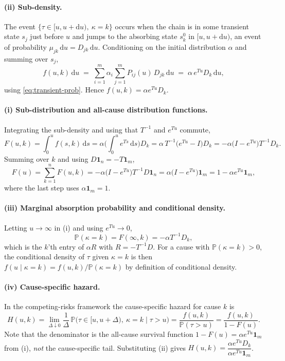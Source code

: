 \documentclass{article}
\newcommand{\Prob}{\mathbb{P}}
\newcommand{\subchg}[1]{#1}
\begin{document}
\paragraph{(ii) Sub-density.}
The event $\{\tau\in[u,u+\mathrm{d}u),\ \kappa=k\}$ occurs when the chain is in some transient state $s_j$ just before $u$ and jumps to the absorbing state $s^0_k$ in $[u,u+\mathrm{d}u)$, an event of probability $\mu_{jk}\,\mathrm{d}u=D_{jk}\,\mathrm{d}u$. Conditioning on the initial distribution $\alpha$ and summing over $s_j$,
\[
f(u,k)\,\mathrm{d}u \;=\; \sum_{i=1}^m \alpha_i \sum_{j=1}^m P_{ij}(u)\, D_{jk}\,\mathrm{d}u
\;=\; \alpha\, e^{Tu} D_k\,\mathrm{d}u,
\]
using \eqref{eq:transient-prob}. Hence $f(u,k)=\alpha e^{Tu}D_k$.

\paragraph{(i) Sub-distribution and all-cause distribution functions.}
Integrating the sub-density and using that $T^{-1}$ and $e^{Tu}$ commute,
\[
F(u,k)=\int_0^u f(s,k)\,\mathrm{d}s
=\alpha\Big(\int_0^u e^{Ts}\,\mathrm{d}s\Big)D_k
=\alpha\, T^{-1}\big(e^{Tu}-I\big)D_k
=-\alpha\big(I-e^{Tu}\big)T^{-1}D_k.
\]
Summing over $k$ and using $D\mathbf{1}_n=-T\mathbf{1}_m$,
\[
F(u)=\sum_{k=1}^n F(u,k)
=-\alpha\big(I-e^{Tu}\big)T^{-1}D\mathbf{1}_n
=\alpha\big(I-e^{Tu}\big)\mathbf{1}_m
=1-\alpha e^{Tu}\mathbf{1}_m,
\]
where the last step uses $\alpha\mathbf{1}_m=1$.

\paragraph{(iii) Marginal absorption probability and conditional density.}
Letting $u\to\infty$ in (i) and using $e^{Tu}\to0$,
\[
\Prob(\kappa=k)=F(\infty,k)=-\alpha T^{-1}D_k,
\]
which is the $k$'th entry of $\alpha R$ with $R=-T^{-1}D$. \subchg{For a cause with $\Prob(\kappa=k)>0$}, the conditional density of $\tau$ given $\kappa=k$ is then $f(u\mid \kappa=k)=f(u,k)/\Prob(\kappa=k)$ by definition of conditional density.

\paragraph{(iv) Cause-specific hazard.}
In the competing-risks framework the cause-specific hazard for cause $k$ is
\[
H(u,k)=\lim_{\Delta\downarrow0}\frac{1}{\Delta}\,\Prob\big(\tau\in[u,u+\Delta),\ \kappa=k \;\big|\; \tau>u\big)
=\frac{f(u,k)}{\Prob(\tau>u)}=\frac{f(u,k)}{1-F(u)}.
\]
Note that the denominator is the all-cause survival function $1-F(u)=\alpha e^{Tu}\mathbf{1}_m$ from (i), \emph{not} the cause-specific tail. Substituting (ii) gives $H(u,k)=\dfrac{\alpha e^{Tu}D_k}{\alpha e^{Tu}\mathbf{1}_m}$.
\end{document}
